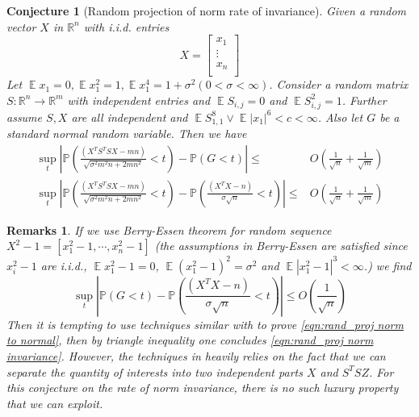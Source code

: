 \documentclass[12pt]{extarticle}
\newtheorem*{remark*}{Remarks}
\newtheorem{conjecture}[theorem]{Conjecture}
\newcommand{\field}[1]{\mathbb{#1}}
\newcommand{\R}{\field{R}}
\newcommand{\1}{\field{1}}
\newcommand{\p}{\field{P}}
\DeclareMathOperator{\E}{\mathbb{E}}
\newcommand{\mat}[2][rrrrrrrrrrrrrrrrrrrrrrrrrrrrrrrr]{\left[ \begin{array}{#1} #2 \\ \end{array}\right]}
\numberwithin{equation}{section}
\begin{document}
\begin{conjecture}[Random projection of norm rate of invariance] \label{conj:rand_proj norm}
Given a random vector $X$ in $\R^n$ with i.i.d. entries
$$X=\mat[c]{x_1\\ \vdots\\ x_n}$$
Let $\E x_1=0, \E x_1^2=1, \E x_1^4 =1+\sigma^2 (0< \sigma <\infty)$.
Consider a  random  matrix $S: \R^n \to \R^m$ with independent entries  and $ \E S_{i,j} = 0$ and  $ \E S_{i,j}^2 = 1$.
Further assume $S,X$ are all independent and $\E S_{1,1}^8\vee \E |x_1|^6<c<\infty$. Also let $G$ be a standard normal random variable. Then we have
\begin{align}
    \sup_t \left| \p\left( \frac{\left(X^TS^TSX - mn\right)}{\sqrt{\sigma^2 m^2n+2mn^2}}  < t \right) - \p\left( G < t \right) \right| 
    \le & O\left(\frac{1}{\sqrt{n}}+ \frac{1}{\sqrt{m}} \right)  \label{eqn:rand_proj norm to normal} \\
\sup_t  \left| \p\left( \frac{\left(X^TS^TSX - mn\right)}{\sqrt{\sigma^2 m^2n+2mn^2}}  < t \right) - \p\left( \frac{( X^T X  - n)}{\sigma\sqrt{n}}   < t \right) \right| 
    \le & O\left(\frac{1}{\sqrt{n}}+ \frac{1}{\sqrt{m}} \right)  \label{eqn:rand_proj norm invariance}
\end{align}
\end{conjecture}
\begin{remark*}
If we use Berry-Essen theorem for random sequence $X^2-1 = [x_1^2-1,\cdots, x_n^2-1]$ (the assumptions in Berry-Essen are satisfied since $x_i^2 -1$ are i.i.d., $\E x_1^2-1 = 0$, $\E(x_1^2 -1)^2=\sigma^2$ and  $\E|x_1^2 -1|^3<\infty$.) we find 
\[
\sup_t  \left| \p\left( G < t \right) - \p\left( \frac{( X^T X  - n)}{\sigma\sqrt{n}}   < t \right) \right| 
    \le  O\left(\frac{1}{\sqrt{n}} \right) 
\]
Then it is tempting to use techniques similar with   \cite{duan2021invariance} to prove \cref{eqn:rand_proj norm to normal}, then by triangle inequality one concludes \cref{eqn:rand_proj norm invariance}. However, the techniques in \cite{duan2021invariance} heavily relies on the fact that we can separate the quantity of interests into two independent parts $X$  and $S^TSZ$. For this conjecture on the rate of norm invariance, there is no such luxury property that we can exploit.  
\end{remark*}
\end{document}
